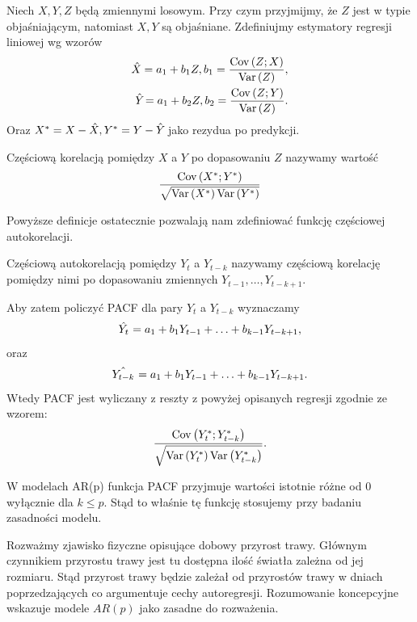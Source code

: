 \documentclass[10pt,a4paper]{book}
\begin{document}
Niech $X,Y,Z$ będą zmiennymi losowym. Przy czym przyjmijmy, że $Z$ jest w typie objaśniającym, natomiast $X,Y$ są objaśniane. Zdefiniujmy estymatory regresji liniowej wg wzorów
\begin{align*}
\predict{X}{} = a_1 + b_1 Z, b_1 = \frac{\Covariance{Z}{X}}{\Variance{Z}}, \\
\predict{Y}{} = a_1 + b_2 Z, b_2 = \frac{\Covariance{Z}{Y}}{\Variance{Z}}.
\end{align*} 
Oraz $X^\ast = X - \predict{X}{}, Y^\ast = Y - \predict{Y}{}$ jako rezydua po predykcji.

\begin{definition}
Częściową korelacją pomiędzy $X$ a $Y$ po dopasowaniu $Z$ nazywamy wartość
$$
\frac{\operatorname{Cov} \left( {X^\ast};{Y^\ast} \right)}{\sqrt{\operatorname{Var} \left( {X^\ast} \right)\operatorname{Var} \left( {Y^\ast} \right)}}
$$
\end{definition}

Powyższe definicje ostatecznie pozwalają nam zdefiniować funkcję częściowej autokorelacji.

\begin{definition}[PACF] 
Częściową autokorelacją pomiędzy $Y_t$ a $Y_{t-k}$ nazywamy częściową korelację pomiędzy nimi po dopasowaniu zmiennych $Y_{t-1}, \ldots, Y_{t-k+1}$.
\end{definition}
Aby zatem policzyć PACF dla pary $Y_t$ a $Y_{t-k}$ wyznaczamy 
$$
\predict{Y_t}{} = a_1 + b_1 Y_{t-1} + \ldots + b_{k-1} Y_{t-k+1},
$$
oraz 
$$
\predict{Y_{t-k}}{} = a_1 + b_1 Y_{t-1} + \ldots + b_{k-1} Y_{t-k+1}.
$$
Wtedy PACF jest wyliczany z reszty z powyżej opisanych regresji zgodnie ze wzorem:
$$
\frac{\operatorname{Cov} \left( {Y_t^\ast};{Y_{t-k}^\ast} \right)}{\sqrt{\operatorname{Var} \left( {Y_t^\ast} \right)\operatorname{Var} \left( {Y_{t-k}^\ast} \right)}}.
$$

\begin{remark}
W modelach AR(p) funkcja PACF przyjmuje wartości istotnie różne od 0 wyłącznie dla $k \leq p$. Stąd to właśnie tę funkcję stosujemy przy badaniu zasadności modelu.
\end{remark}

\begin{example}
Rozważmy zjawisko fizyczne opisujące dobowy przyrost trawy. Głównym czynnikiem przyrostu trawy jest tu dostępna ilość światła zależna od jej rozmiaru. Stąd przyrost trawy będzie zależał od przyrostów trawy w dniach poprzedzających co argumentuje cechy autoregresji. Rozumowanie koncepcyjne wskazuje modele $AR(p)$ jako zasadne do rozważenia.
\end{example}
\end{document}
